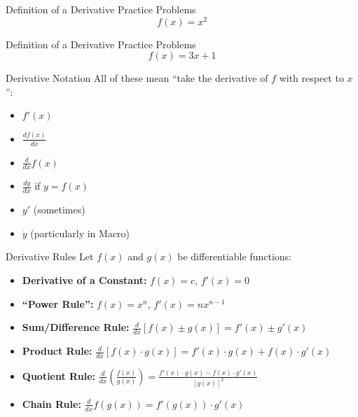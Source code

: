 \documentclass[aspectratio=169]{beamer}
\begin{document}
\begin{frame}{Definition of a Derivative Practice Problems}\label{main1}
	\vspace{-4cm}
    \[
    f(x) = x^{2}
    \]
\end{frame}

\begin{frame}{Definition of a Derivative Practice Problems}\label{main3}
    \vspace{-4cm}
    \[
    f(x) = 3x + 1
    \]
\end{frame}

\begin{frame}{Derivative Notation}\label{main1}
All of these mean “take the derivative of \(f\) with respect to \(x\)”:
\begin{itemize}
\begin{itemize}
    \item \(f'(x)\)
    \item \(\frac{df(x)}{dx}\)
    \item \(\frac{d}{dx} f(x)\)
    \item \(\frac{dy}{dx}\) if \(y = f(x)\)
    \item \(y'\) (sometimes)
    \item \( \dot{y} \) (particularly in Macro)
\end{itemize}
\end{itemize}
\end{frame}

\begin{frame}{Derivative Rules}\label{main1}
Let \(f(x)\) and \(g(x)\) be differentiable functions:
\begin{itemize}
    \item \textbf{Derivative of a Constant:} \(f(x) = c\), \(f'(x) = 0\)
    \item \textbf{“Power Rule”:} \(f(x) = x^n\), \(f'(x) = nx^{n-1}\) 
    \item \textbf{Sum/Difference Rule:} \quad $\frac{d}{dx} [f(x) \pm g(x)] = f'(x) \pm g'(x)$
    \item \textbf{Product Rule:} \quad $\frac{d}{dx} [f(x) \cdot g(x)] = f'(x) \cdot g(x) + f(x) \cdot g'(x)$
    \item \textbf{Quotient Rule:} \quad $\frac{d}{dx} \left( \frac{f(x)}{g(x)} \right) = \frac{f'(x) \cdot g(x) - f(x) \cdot g'(x)}{[g(x)]^2}$
    \item \textbf{Chain Rule:} \quad $\frac{d}{dx} f(g(x)) = f'(g(x)) \cdot g'(x)$
\end{itemize}
\end{frame}
\end{document}
